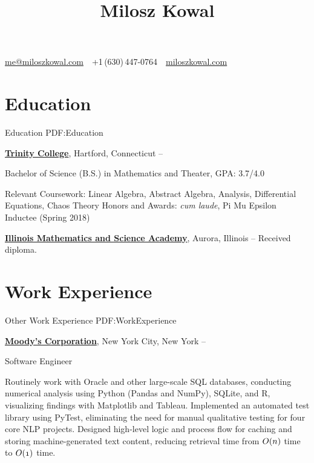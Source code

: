 \documentclass[letterpaper,10pt,oneside]{article}
\newcommand{\CVAuthor}{Milosz Kowal}
\newcommand{\CVWebpage}{https://miloszkowal.com}
\begin{document}

\title{\CVAuthor}

\begin{subtitle}
\par
\href{mailto:me@miloszkowal.com}
{me@miloszkowal.com}
\,\SubBulletSymbol\,
+1\,(630)\,447-0764
\,\SubBulletSymbol\,
\href{\CVWebpage}
{miloszkowal.com}
\end{subtitle}

\begin{body}


\section
{Education}
{Education}
{PDF:Education}

\href{http://www.trincoll.edu}
{\textbf{Trinity College}},
Hartford, Connecticut
\hfill
{} --

\GapNoBreak
\BulletItem
Bachelor of Science (B.S.) in
Mathematics and Theater, GPA: 3.7/4.0
\begin{detail}
\SubBulletItem
Relevant Coursework: Linear Algebra, Abstract Algebra, Analysis, Differential Equations, Chaos Theory
\SubBulletItem
Honors and Awards: \textit{cum laude}, Pi Mu Epsilon Inductee (Spring 2018)
\end{detail}

\GapNoBreak
\href{http://www.imsa.edu}
{\textbf{Illinois Mathematics and Science Academy}},
Aurora, Illinois
\hfill
{} --
\GapNoBreak
\BulletItem
Received diploma.


\noindent\hrulefill
\section
{Work\newline
Experience}
{Other Work Experience}
{PDF:WorkExperience}

\href{http://www.moodys.com}
{\textbf{Moody's Corporation}},
New York City, New York
\hfill
{} --

\GapNoBreak
\BulletItem
Software Engineer
\begin{detail}
\SubBulletItem
Routinely work with Oracle and other large-scale SQL databases, conducting numerical analysis using Python (Pandas and NumPy), SQLite, and R, visualizing findings with Matplotlib and Tableau.
\SubBulletItem
Implemented an automated test library using PyTest, eliminating the need for manual qualitative testing for four core NLP projects.
\SubBulletItem
Designed high-level logic and process flow for caching and storing machine-generated text content, reducing retrieval time from $\mathnormal{O(n)}$ time to $\mathnormal{O(1)}$ time.
\end{detail}


\end{body}
\end{document}
